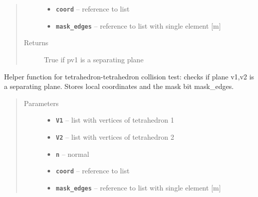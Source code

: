 \documentclass[letterpaper,10pt,english]{sphinxmanual}
\begin{document}
\begin{fulllineitems}
\begin{fulllineitems}
\begin{quote}
\begin{description}
\begin{itemize}
\item {} 
\textbf{\texttt{coord}} -- reference to list

\item {} 
\textbf{\texttt{mask\_edges}} -- reference to list with single element {[}m{]}

\end{itemize}

\item[{Returns}] \leavevmode
True if pv1 is a separating plane

\end{description}\end{quote}

\end{fulllineitems}


\begin{fulllineitems}
\label{pk_src.collision_tet_tet:pk_src.collision_tet_tet.Collision_tet_tet.separating_plane_faceA_2}
Helper function for tetrahedron-tetrahedron collision test:
checks if plane v1,v2 is a separating plane. Stores local coordinates and the mask bit mask\_edges.
\begin{quote}\begin{description}
\item[{Parameters}] \leavevmode\begin{itemize}
\item {} 
\textbf{\texttt{V1}} -- list with vertices of tetrahedron 1

\item {} 
\textbf{\texttt{V2}} -- list with vertices of tetrahedron 2

\item {} 
\textbf{\texttt{n}} -- normal

\item {} 
\textbf{\texttt{coord}} -- reference to list

\item {} 
\textbf{\texttt{mask\_edges}} -- reference to list with single element {[}m{]}

\end{itemize}

\end{description}\end{quote}

\end{fulllineitems}


\end{fulllineitems}
\end{document}
